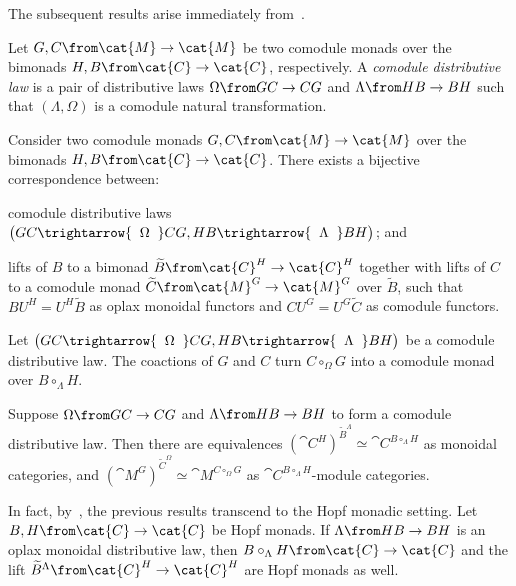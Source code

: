 The subsequent results arise immediately from~\cite{Street1972}.

\begin{definition}\label{def: comodule_distributive_law}
  Let \(G, C \from \cat{M} \to \cat{M}\) be two comodule monads
  over the bimonads \(H,B \from \cat{C} \to \cat{C}\), respectively.
  A \emph{comodule distributive law} is a pair of distributive laws
  \(\Omega \from GC \to CG\) and \(\Lambda \from HB \to BH\)
  such that \((\Lambda, \Omega)\) is a comodule natural transformation.
\end{definition}

\begin{proposition}\label{prop: distributive_laws_are_lifts_of_monads}
  Consider two comodule monads \(G, C \from \cat{M} \to \cat{M}\)
  over the bimonads \(H,B \from \cat{C} \to \cat{C}\).
  There exists a bijective correspondence between:
  \begin{thmlist}[noitemsep]
    \item comodule distributive laws \(\big(GC \trightarrow{\;\;\Omega\;\;} CG, HB \trightarrow{\;\;\Lambda\;\;} BH\big)\); and
    \item lifts of \(B\) to a bimonad \(\widetilde{B} \from \cat{C}^H \to \cat{C}^H\)
    together with lifts of \(C\) to a comodule monad \(\widetilde{C} \from \cat{M}^G \to \cat{M}^G\) over \(\widetilde{B}\),
    such that \(B U^H = U^H\widetilde{B}\) as oplax monoidal functors
    and \(C U^G = U^G \widetilde{C}\) as comodule functors.
  \end{thmlist}
\end{proposition}

Let \(\big(GC \trightarrow{\;\;\Omega\;\;} CG, HB \trightarrow{\;\;\Lambda\;\;} BH\big)\) be a comodule distributive law.
The coactions of \(G\) and \(C\) turn \(C \circ_{\Omega} G\) into a comodule monad over \(B \circ_{\Lambda} H\).

\begin{lemma}\label{lem: distributive_laws_and_comparison_functor}
  Suppose \(\Omega \from GC \to CG\) and \(\Lambda \from HB \to BH\) to form a comodule distributive law.
  Then there are equivalences \({(\cat{C}^H)}^{\widetilde{B}^{\Lambda}} \simeq \cat{C}^{B \circ_{\Lambda} H}\) as monoidal categories,
  and \({(\cat{M}^G)}^{\widetilde{C}^{\Omega}} \simeq \cat{M}^{C \circ_{\Omega} G}\) as \(\cat{C}^{B \circ_{\Lambda} H}\)\hyp{}module categories.
\end{lemma}

In fact, by~\cite[Section~4.5]{Bruguieres2012}, the previous results transcend to the Hopf monadic setting.
Let \(B, H \from \cat{C} \to \cat{C}\) be Hopf monads.
If \(\Lambda \from HB \to BH\) is an oplax monoidal distributive law,
then \(B \circ_{\Lambda} H\from \cat{C} \to \cat{C}\)
and the lift \(\widetilde{B}^{\Lambda} \from \cat{C}^H \to \cat{C}^H\) are Hopf monads as well.

